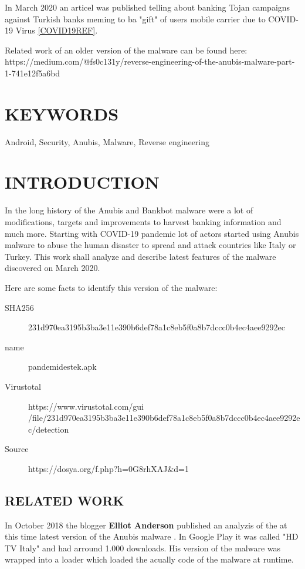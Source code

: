 \documentclass[10pt,titlepage]{article}
\begin{document}
In March 2020 an articel was published telling about banking Tojan campaigns against Turkish banks meming to ba "gift" of users mobile carrier due to COVID-19 Virus \ref{COVID19REF}. \cite{ANUBISTURKEY2020} 


Related work of an older version of the malware can be found here: https://medium.com/@fs0c131y/reverse-engineering-of-the-anubis-malware-part-1-741e12f5a6bd

\section{KEYWORDS}
	Android,
    Security,
    Anubis,
    Malware,
    Reverse engineering

\section{INTRODUCTION}
In the long history of the Anubis and Bankbot malware were a lot of modifications, targets and improvements to harvest banking information and much more. Starting with COVID-19 pandemic lot of actors started using Anubis malware to abuse the human disaster to spread and attack countries like Italy or Turkey. This work shall analyze and describe latest features of the malware discovered on March 2020.

Here are some facts to identify this version of the malware:
\begin{description}
\item[SHA256] 231d970ea3195b3ba3e11e390b6def78a1c8eb5f0a8b7dccc0b4ec4aee9292ec
\item[name] pandemidestek.apk
\item[Virustotal] https://www.virustotal.com/gui
\\  /file/231d970ea3195b3ba3e11e390b6def78a1c8eb5f0a8b7dccc0b4ec4aee9292ec/detection
\item[Source] https://dosya.org/f.php?h=0G8rhXAJ\&d=1
\end{description}

\subsection{RELATED WORK}
In October 2018 the blogger \textbf{Elliot Anderson} published an analyzis of the at this time latest version of the Anubis malware \cite{REVEANUBIS}. In Google Play it was called "HD TV Italy" and had arround 1.000 downloads.
His version of the malware was wrapped into a loader which loaded the acually code of the malware at runtime.
\end{document}
